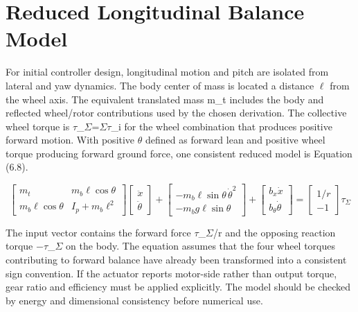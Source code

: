 \section{Reduced Longitudinal Balance Model}\label{reduced-longitudinal-balance-model}

For initial controller design, longitudinal motion and pitch are
isolated from lateral and yaw dynamics. The body center of mass is
located a distance \ensuremath{\ell} from the wheel axis. The equivalent translated mass
m\_t includes the body and reflected wheel\slash{}rotor contributions used by
the chosen derivation. The collective wheel torque is \ensuremath{\tau}\_\ensuremath{\Sigma}=\ensuremath{\Sigma}\ensuremath{\tau}\_i for the
wheel combination that produces positive forward motion. With positive \ensuremath{\theta}
defined as forward lean and positive wheel torque producing forward
ground force, one consistent reduced model is Equation (6.8).

\begin{equation}
\begin{bmatrix}m_t&m_b\ell\cos\theta\\m_b\ell\cos\theta&I_p+m_b\ell^2\end{bmatrix}
\begin{bmatrix}\ddot{x}\\\ddot{\theta}\end{bmatrix}+
\begin{bmatrix}-m_b\ell\sin\theta\,\dot{\theta}^{2}\\-m_bg\ell\sin\theta\end{bmatrix}+
\begin{bmatrix}b_x\dot{x}\\b_\theta\dot{\theta}\end{bmatrix}
=\begin{bmatrix}1\slash{}r\\-1\end{bmatrix}\tau_{\Sigma}
\label{eq:6-8}
\end{equation}

The input vector contains the forward force \ensuremath{\tau}\_\ensuremath{\Sigma}/r and the opposing
reaction torque \ensuremath{-}\ensuremath{\tau}\_\ensuremath{\Sigma} on the body. The equation assumes that the four
wheel torques contributing to forward balance have already been
transformed into a consistent sign convention. If the actuator reports
motor-side rather than output torque, gear ratio and efficiency must be
applied explicitly. The model should be checked by energy and
dimensional consistency before numerical use.

